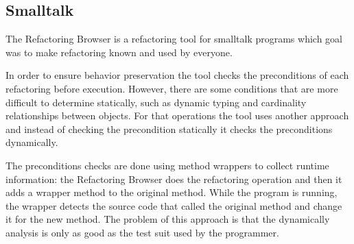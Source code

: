 
\subsection{Smalltalk}%

The Refactoring Browser \cite{roberts1997refactoring} is a refactoring tool for smalltalk programs which goal was to make refactoring known and used by everyone.



In order to ensure behavior preservation the tool checks the preconditions of each refactoring before execution. 
However, there are some conditions that are more difficult to determine statically, such as dynamic typing and cardinality relationships between objects. For that operations the tool uses another approach and instead of checking the precondition statically it checks the preconditions dynamically. 

The preconditions checks are done using method wrappers to collect runtime information: the Refactoring Browser does the refactoring operation and then it adds a wrapper method to the original method. While the program is running, the wrapper detects the source code that called the original method and change it for the new method.
The problem of this approach is that the dynamically analysis is only as good as the test suit used by the programmer.


